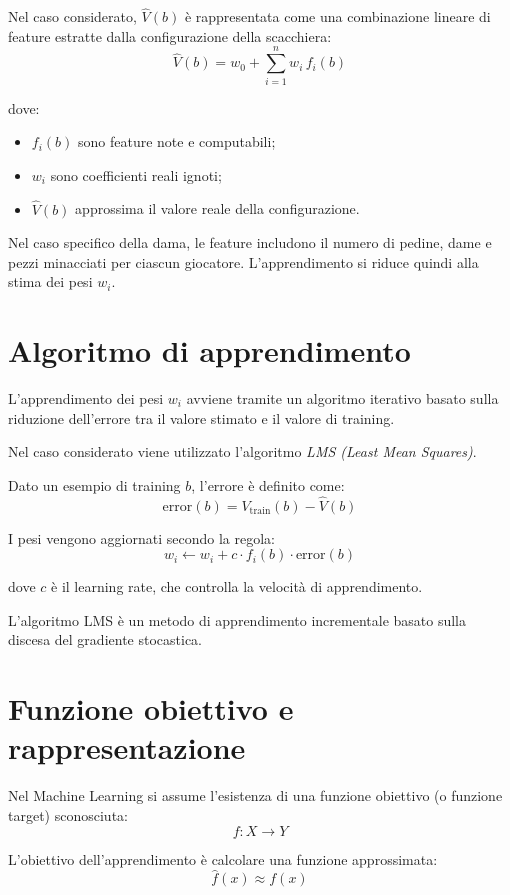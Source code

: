 \documentclass[a4paper,12pt]{report}
\begin{document}
Nel caso considerato, \( \hat V(b) \) è rappresentata come una combinazione lineare di feature estratte dalla configurazione della scacchiera:
\[
\hat V(b) = w_0 + \sum_{i=1}^{n} w_i \, f_i(b)
\]

dove:
\begin{itemize}
    \item \( f_i(b) \) sono feature note e computabili;
    \item \( w_i \) sono coefficienti reali ignoti;
    \item \( \hat V(b) \) approssima il valore reale della configurazione.
\end{itemize}

Nel caso specifico della dama, le feature includono il numero di pedine, dame e pezzi minacciati per ciascun giocatore.
L’apprendimento si riduce quindi alla stima dei pesi \( w_i \).

\section{Algoritmo di apprendimento}

L’apprendimento dei pesi \( w_i \) avviene tramite un algoritmo iterativo basato sulla riduzione dell’errore tra il valore stimato e il valore di training.

Nel caso considerato viene utilizzato l’algoritmo \textit{LMS (Least Mean Squares)}.

Dato un esempio di training \( b \), l’errore è definito come:
\[
\text{error}(b) = V_{\text{train}}(b) - \hat V(b)
\]

I pesi vengono aggiornati secondo la regola:
\[
w_i \leftarrow w_i + c \cdot f_i(b) \cdot \text{error}(b)
\]

dove \( c \) è il learning rate, che controlla la velocità di apprendimento.

L’algoritmo LMS è un metodo di apprendimento incrementale basato sulla discesa del gradiente stocastica.


\section{Funzione obiettivo e rappresentazione}

Nel Machine Learning si assume l’esistenza di una funzione obiettivo (o funzione target) sconosciuta:
\[
f : X \rightarrow Y
\]

L’obiettivo dell’apprendimento è calcolare una funzione approssimata:
\[
\hat{f}(x) \approx f(x)
\]
\end{document}
